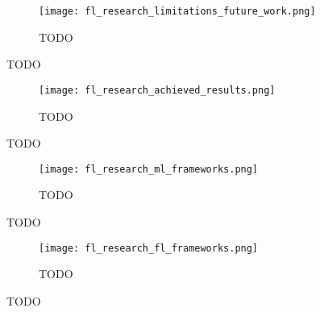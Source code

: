 \begin{figure}[h]
    \centering
    \texttt{[image: fl\_research\_limitations\_future\_work.png]}
    \caption{TODO}
    \label{fig:fl_research_limitations_future_work}
\end{figure}

TODO

\begin{figure}[h]
    \centering
    \texttt{[image: fl\_research\_achieved\_results.png]}
    \caption{TODO}
    \label{fig:fl_research_achieved_results}
\end{figure}

TODO

\begin{figure}[h]
    \centering
    \texttt{[image: fl\_research\_ml\_frameworks.png]}
    \caption{TODO}
    \label{fig:fl_research_ml_frameworks}
\end{figure}

TODO

\begin{figure}[h]
    \centering
    \texttt{[image: fl\_research\_fl\_frameworks.png]}
    \caption{TODO}
    \label{fig:fl_research_fl_frameworks}
\end{figure}

TODO
